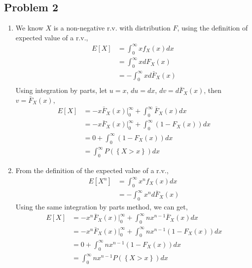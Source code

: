 \documentclass{article}
\begin{document}
	\subsection*{Problem 2}
		\begin{enumerate}
			\item We know $X$ is a non-negative r.v. with distribution $F$, using the
				definition of expected value of a r.v.,
				\begin{align*}
					E[X] &= \int_{0}^{\infty} xf_{X}(x)dx \\
					&= \int_{0}^{\infty} xdF_{X}(x) \\
					&= -\int_{0}^{\infty} xd\bar{F}_X(x) \\
				\end{align*}
				Using integration by parts,
				let $u = x$, $du = dx$, $dv = d\bar{F}_{X}(x)$, then $v = \bar{F}_{X}(x)$,
				\begin{align*}
					E[X] &= -x\bar{F}_{X}(x) \bigg|_{0}^{\infty} + \int_{0}^{\infty}\bar{F}_{X}(x)dx \\
					&= -x\bar{F}_{X}(x) \bigg|_{0}^{\infty} + \int_{0}^{\infty}(1 - F_{X}(x))dx \\
					&= 0 + \int_{0}^{\infty}(1 - F_{X}(x))dx \\
					&= \int_{0}^{\infty}P(\left\{ X > x \right\})dx
				\end{align*}
			\item From the definition of the expected value of a r.v.,
				\begin{align*}
					E[X^n] &= \int_{0}^{\infty} x^nf_{X}(x)dx \\
					&= -\int_{0}^{\infty} x^nd\bar{F}_X(x)
				\end{align*}
				Using the same integration by parts method, we can get,
				\begin{align*}
					E[X] &= -x^n\bar{F}_{X}(x) \bigg|_{0}^{\infty} + \int_{0}^{\infty}nx^{n-1}\bar{F}_{X}(x)dx \\
					&= -x^n\bar{F}_{X}(x) \bigg|_{0}^{\infty} + \int_{0}^{\infty}nx^{n-1}(1 - F_{X}(x))dx \\
					&= 0 + \int_{0}^{\infty}nx^{n-1}(1 - F_{X}(x))dx \\
					&= \int_{0}^{\infty}nx^{n-1}P(\left\{ X > x \right\})dx
				\end{align*}
		\end{enumerate}
\end{document}

